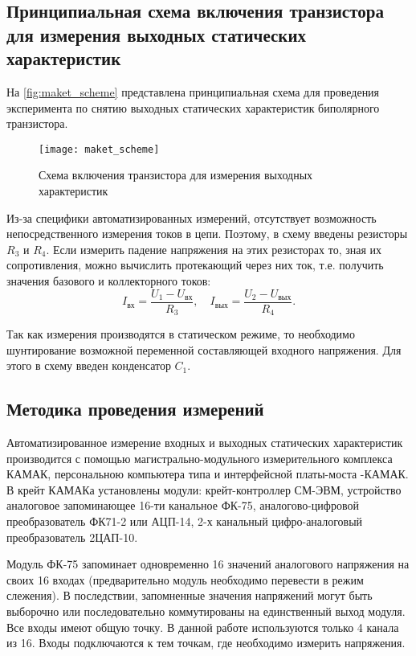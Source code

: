 \subsection{Принципиальная схема включения транзистора для измерения выходных статических характеристик}

На \autoref{fig:maket_scheme} представлена принципиальная схема для проведения эксперимента по снятию выходных статических характеристик биполярного транзистора.

\begin{figure}[h]%
    \centering
    \texttt{[image: maket\_scheme]}%
    \caption[]{Схема включения транзистора для измерения выходных характеристик}%
    \label{fig:maket_scheme}%
\end{figure}

Из-за специфики автоматизированных измерений, отсутствует возможность непосредственного измерения токов в цепи. Поэтому, в схему введены резисторы $R_3$ и $R_4$. Если измерить падение напряжения на этих резисторах то, зная их сопротивления, можно вычислить протекающий через них ток, т.е. получить значения базового и коллекторного токов:
%
\begin{equation*}
    I_\text{вх} = \frac{U_1 - U_\text{вх}}{R_3}, \quad
    I_\text{вых} = \frac{U_2 - U_\text{вых}}{R_4} .
\end{equation*}

Так как измерения производятся в статическом режиме, то необходимо шунтирование возможной переменной составляющей входного напряжения. Для этого в схему введен конденсатор $C_1$.

\subsection{Методика проведения измерений}

Автоматизированное измерение входных и выходных статических характеристик производится с помощью магистрально-модульного измерительного комплекса КАМАК, персональною компьютера типа  и интерфейсной платы-моста -КАМАК. В крейт КАМАКа установлены модули: крейт-контроллер СМ-ЭВМ, устройство аналоговое запоминающее 16-ти канальное ФК-75, аналогово-цифровой преобразователь ФК71-2 или АЦП-14, 2-х канальный цифро-аналоговый преобразователь 2ЦАП-10.

Модуль ФК-75 запоминает одновременно 16 значений аналогового напряжения на своих 16 входах (предварительно модуль необходимо перевести в режим слежения). В последствии, запомненные значения напряжений могут быть выборочно или последовательно коммутированы на единственный выход модуля. Все входы имеют общую точку. В данной работе используются только 4 канала из 16. Входы подключаются к тем точкам, где необходимо измерить напряжения.

